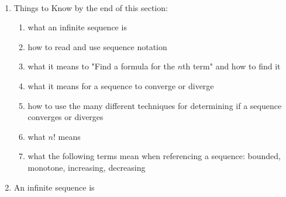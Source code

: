 \documentclass[11pt,fleqn]{article}
\begin{document}
\renewcommand{\headrulewidth}{0pt}
\newcommand{\blank}[1]{\rule{#1}{0.75pt}}
\newcommand{\bc}{\begin{center}}
\newcommand{\ec}{\end{center}}


\vspace*{-0.7in}

\begin{center}
  \large
  \\
   
\end{center}

\begin{enumerate}
\item Things to Know by the end of this section:
\begin{multicols}{2}
	\begin{enumerate}
	\item what an infinite sequence is
	\item how to read and use sequence notation
	\item what it means to "Find a formula for the $n$th term" and how to find it
	\item what it means for a sequence to converge or diverge
	\item how to use the many different techniques for determining if a sequence converges or diverges
	\item what $n!$ means
	\item what the following terms mean when referencing a sequence: bounded, monotone, increasing, decreasing
	\end{enumerate}
\end{multicols}
\item An infinite sequence is 

\vspace{1in}


\end{enumerate}
\end{document}

